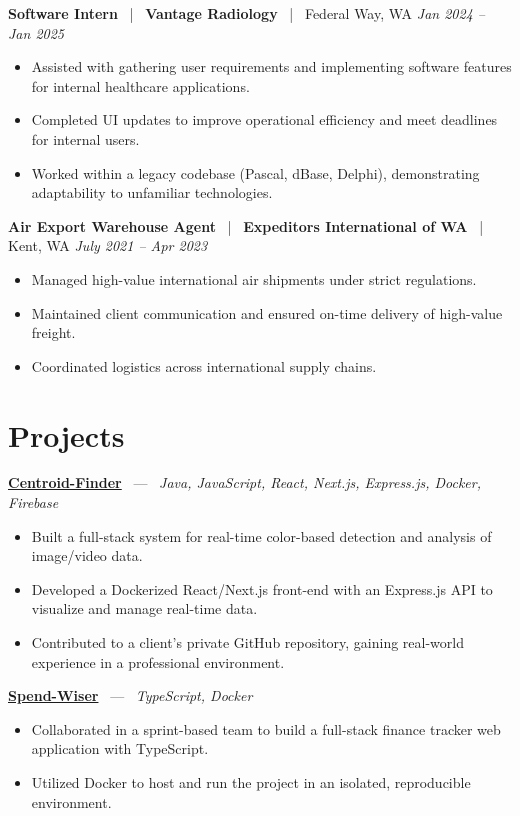 \documentclass[10pt, letterpaper]{article}
\newcommand{\jobhead}[4]{%
  \vspace{5pt}%
  {\bfseries\color{dark}#1}%
  ~{\color{light}|}~%
  {\bfseries\color{navy}#2}%
  ~{\color{light}|}~%
  {\color{light}#3}%
  \hfill{\color{light}\small\textit{#4}}\\[-2pt]%
}
\newcommand{\projhead}[3]{%
  \vspace{5pt}%
  {\bfseries\color{dark}\href{#2}{#1}}%
  ~{\color{light}---}~%
  {\color{light}\small\textit{#3}}\\[-2pt]%
}
\begin{document}
\jobhead{Software Intern}{Vantage Radiology}{Federal Way, WA}{Jan 2024 – Jan 2025}
\begin{itemize}
  \item Assisted with gathering user requirements and implementing software features for internal healthcare applications.
  \item Completed UI updates to improve operational efficiency and meet deadlines for internal users.
  \item Worked within a legacy codebase (Pascal, dBase, Delphi), demonstrating adaptability to unfamiliar technologies.
\end{itemize}

\jobhead{Air Export Warehouse Agent}{Expeditors International of WA}{Kent, WA}{July 2021 – Apr 2023}
\begin{itemize}
  \item Managed high-value international air shipments under strict regulations.
  \item Maintained client communication and ensured on-time delivery of high-value freight.
  \item Coordinated logistics across international supply chains.
\end{itemize}

\section{Projects}

\projhead{Centroid-Finder}{https://github.com/xavierb117/centroid-finder}{Java, JavaScript, React, Next.js, Express.js, Docker, Firebase}
\begin{itemize}
  \item Built a full-stack system for real-time color-based detection and analysis of image/video data.
  \item Developed a Dockerized React/Next.js front-end with an Express.js API to visualize and manage real-time data.
  \item Contributed to a client's private GitHub repository, gaining real-world experience in a professional environment.
\end{itemize}

\projhead{Spend-Wiser}{https://github.com/JesseChum/w26-sdev372-spendwiser-finance-tracker}{TypeScript, Docker}
\begin{itemize}
  \item Collaborated in a sprint-based team to build a full-stack finance tracker web application with TypeScript.
  \item Utilized Docker to host and run the project in an isolated, reproducible environment.
\end{itemize}
\end{document}
